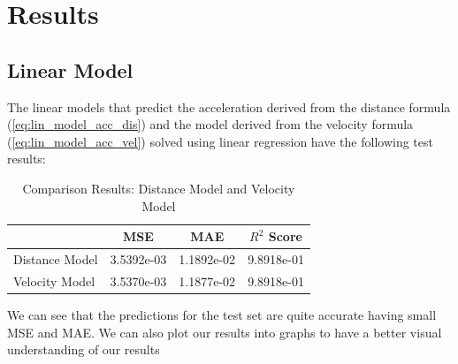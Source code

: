 \section{Results}

\subsection{Linear Model}

The linear models that predict the acceleration derived from the distance formula
(\ref{eq:lin_model_acc_dis}) and the model derived from the velocity formula (\ref{eq:lin_model_acc_vel}) solved using linear regression have the following test results:


\begin{table}[htbp]
\centering
\caption{Comparison Results: Distance Model and Velocity Model}
\label{tab:model_comparison}
\begin{tabular}{l S[table-format=1.4e-2] S[table-format=1.4e-2] S[table-format=1.4e-2]}
\toprule
 & {MSE} & {MAE} & {$R^2$ Score} \\
\midrule
Distance Model & 3.5392e-03 & 1.1892e-02 & 9.8918e-01 \\
Velocity Model & 3.5370e-03 & 1.1877e-02 & 9.8918e-01 \\
\bottomrule
\end{tabular}
\end{table}

We can see that the predictions for the test set are quite accurate having small MSE and MAE. 
We can also plot our results into graphs to have a better visual understanding of our results

